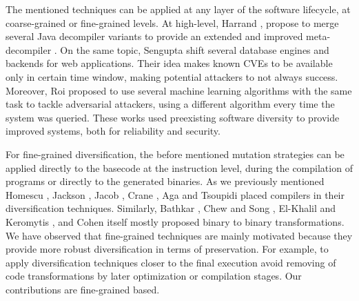 The mentioned techniques can be applied at any layer of the software lifecycle, at coarse-grained or fine-grained levels.
At high-level, Harrand \etal, propose to merge several Java decompiler variants to provide an extended and improved meta-decompiler \cite{harrand2020java}. On the same topic, Sengupta \etal \cite{10.5555/3091125.3091155} shift several database engines and backends for web applications. Their idea makes known CVEs to be available only in certain time window, making potential attackers to not always success. Moreover, Roi \etal \cite{10.1145/3318216.3363338} proposed to use several machine learning algorithms with the same task to tackle adversarial attackers, using a different algorithm every time the system was queried.
These works used preexisting software diversity to provide improved systems, both for reliability and security.

For fine-grained diversification, the before mentioned mutation strategies can be applied directly to the basecode at the instruction level, during the compilation of programs or directly to the generated binaries. As we previously mentioned Homescu \etal \cite{homescu2013profile}, Jackson \etal \cite{jackson, jackson2011compiler}, Jacob \etal \cite{jacob2008superdiversifier}, Crane \etal \cite{crane2015thwarting}, Aga \etal \cite{aga2019smokestack}  and Tsoupidi \etal \cite{Tsoupidi2020ConstraintBasedSD} placed compilers in their diversification techniques. Similarly, Bathkar \etal \cite{bhatkar03,bhatkar2005efficient}, Chew and Song \cite{Chew02mitigatingbuffer}, El-Khalil and Keromytis \cite{ElKhalil2004}, and Cohen \cite{cohen1993operating} itself mostly proposed binary to binary transformations. 
We have observed that fine-grained techniques are mainly motivated because they provide more robust diversification in terms of preservation. For example, to apply diversification techniques closer to the final execution avoid removing of code transformations by later optimization or compilation stages. Our contributions are fine-grained based. 

